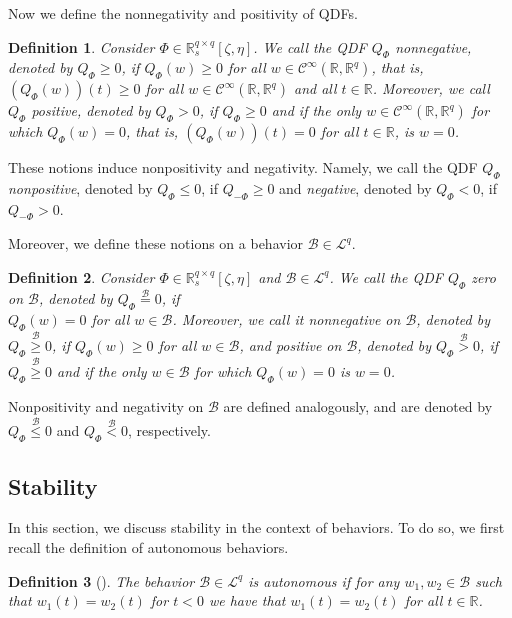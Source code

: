 \documentclass[letterpaper, 10 pt, conference]{ieeeconf}
\theoremstyle{ieeeconf}
\newtheorem{definition}{Definition}
\newcommand{\R}{\mathbb{R}}
\newcommand{\B}{\mathcal{B}}
\begin{document}
Now we define the nonnegativity and positivity of QDFs. 
\begin{definition}
	Consider $\Phi \in \R_s^{q \times q}[\zeta, \eta]$. We call the QDF $Q_\Phi$ \emph{nonnegative}, denoted by $Q_\Phi \geq 0$, if ${Q_\Phi(w) \geq 0}$ for all $w\in \mathcal{C}^\infty(\R,\R^q)$, that is, ${\left(Q_\Phi(w)\right)(t) \geq 0}$ for all ${w\in \mathcal{C}^\infty(\R,\R^q)}$ and all $t\in \R$. Moreover, we call $Q_\Phi$ \emph{positive}, denoted by $Q_\Phi>0$, if ${Q_\Phi \geq 0}$ and if the only ${w\in \mathcal{C}^\infty (\R,\R^q)}$ for which ${Q_\Phi(w)=0}$, that is, ${\left(Q_{\Phi}(w)\right)(t)=0}$ for all $t\in \R$, is $w=0$. 
\end{definition}
These notions induce nonpositivity and negativity. Namely, we call the QDF $Q_\Phi$ \emph{nonpositive}, denoted by $Q_\Phi \leq 0$, if $Q_{-\Phi} \geq 0$ and \emph{negative}, denoted by $Q_\Phi <0$, if $Q_{-\Phi} >0$.

Moreover, we define these notions on a behavior $\B \in \mathcal{L}^q$.
\begin{definition}
	Consider $\Phi \in \R_s^{q \times q}[\zeta, \eta]$ and $\mathcal{B}\in \mathcal{L}^q$. We call the QDF $Q_\Phi$ \emph{zero} on $\mathcal{B}$, denoted by $Q_\Phi \stackrel{\mathcal{B}}{=}0$, if \\$Q_\Phi(w)=0$ for all $w\in \mathcal{B}$. Moreover, we call it \emph{nonnegative} on $\B$, denoted by $Q_\Phi \stackrel{\mathcal{B}}{\geq} 0$, if $Q_\Phi(w) \geq 0$ for all $w\in \B$, and \emph{positive} on $\B$, denoted by $Q_\Phi\stackrel{\mathcal{B}}{>}0$, if $Q_\Phi \stackrel{\mathcal{B}}{\geq} 0$ and if the only $w\in\B$ for which $Q_\Phi(w)=0$ is $w=0$.
\end{definition}
Nonpositivity and negativity on $\B$ are defined analogously, and are denoted by $Q_\Phi \stackrel{\B}{\leq}0$ and $Q_\Phi \stackrel{\B}{<}0$, respectively.
\subsection{Stability}
In this section, we discuss stability in the context of behaviors. To do so, we first recall the definition of autonomous behaviors.

\begin{definition}[\hspace{-0.01ex}\cite{willems_quadratic_1998}] The behavior $\B\in \mathcal{L}^q$ is \emph{autonomous} if for any $w_1,w_2 \in \mathcal{B}$ such that $w_1(t)=w_2(t)$ for $t<0$ we have that $w_1(t)=w_2(t)$ for all $t \in \R$.
\end{definition} 
\end{document}
